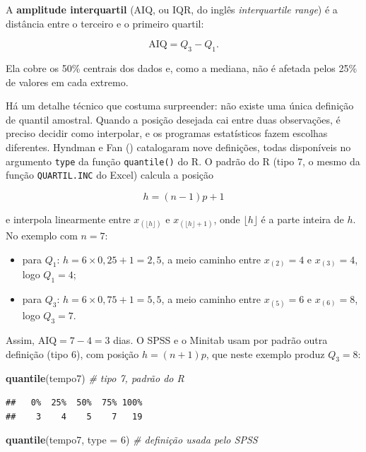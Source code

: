 \documentclass[
]{book}
\newenvironment{Shaded}{\begin{snugshade}}{\end{snugshade}}
\newcommand{\AttributeTok}[1]{\textcolor[rgb]{0.13,0.29,0.53}{#1}}
\newcommand{\CommentTok}[1]{\textcolor[rgb]{0.56,0.35,0.01}{\textit{#1}}}
\newcommand{\DecValTok}[1]{\textcolor[rgb]{0.00,0.00,0.81}{#1}}
\newcommand{\FunctionTok}[1]{\textcolor[rgb]{0.13,0.29,0.53}{\textbf{#1}}}
\newcommand{\NormalTok}[1]{#1}
\providecommand{\tightlist}{%
  \setlength{\itemsep}{0pt}\setlength{\parskip}{0pt}}
\begin{document}
A \textbf{amplitude interquartil} (AIQ, ou IQR, do inglês \emph{interquartile range}) é a distância entre o terceiro e o primeiro quartil:

\[
\text{AIQ} = Q_3 - Q_1 .
\]

Ela cobre os 50\% centrais dos dados e, como a mediana, não é afetada pelos 25\% de valores em cada extremo.

Há um detalhe técnico que costuma surpreender: não existe uma única definição de quantil amostral. Quando a posição desejada cai entre duas observações, é preciso decidir como interpolar, e os programas estatísticos fazem escolhas diferentes. Hyndman e Fan () catalogaram nove definições, todas disponíveis no argumento \texttt{type} da função \texttt{quantile()} do R. O padrão do R (tipo 7, o mesmo da função \texttt{QUARTIL.INC} do Excel) calcula a posição

\[
h = (n - 1)p + 1
\]

e interpola linearmente entre \(x_{(\lfloor h \rfloor)}\) e \(x_{(\lfloor h \rfloor + 1)}\), onde \(\lfloor h \rfloor\) é a parte inteira de \(h\). No exemplo com \(n = 7\):

\begin{itemize}
\tightlist
\item
  para \(Q_1\): \(h = 6 \times 0{,}25 + 1 = 2{,}5\), a meio caminho entre \(x_{(2)} = 4\) e \(x_{(3)} = 4\), logo \(Q_1 = 4\);
\item
  para \(Q_3\): \(h = 6 \times 0{,}75 + 1 = 5{,}5\), a meio caminho entre \(x_{(5)} = 6\) e \(x_{(6)} = 8\), logo \(Q_3 = 7\).
\end{itemize}

Assim, \(\text{AIQ} = 7 - 4 = 3\) dias. O SPSS e o Minitab usam por padrão outra definição (tipo 6), com posição \(h = (n + 1)p\), que neste exemplo produz \(Q_3 = 8\):

\begin{Shaded}
\begin{Highlighting}[]
\FunctionTok{quantile}\NormalTok{(tempo7)            }\CommentTok{\# tipo 7, padrão do R}
\end{Highlighting}
\end{Shaded}

\begin{verbatim}
##   0%  25%  50%  75% 100% 
##    3    4    5    7   19
\end{verbatim}

\begin{Shaded}
\begin{Highlighting}[]
\FunctionTok{quantile}\NormalTok{(tempo7, }\AttributeTok{type =} \DecValTok{6}\NormalTok{)  }\CommentTok{\# definição usada pelo SPSS}
\end{Highlighting}
\end{Shaded}
\end{document}
